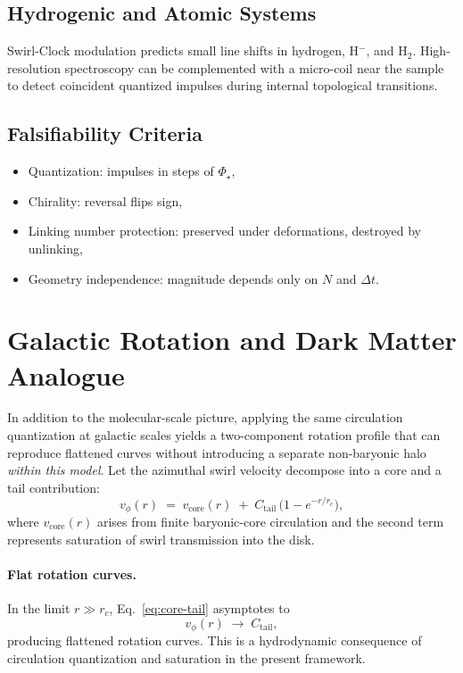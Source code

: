 \documentclass[reprint,aps,onecolumn,nofootinbib]{revtex4-2}
\newcommand{\rc}{r_c}                                    %
\providecommand{\rc}{r_c}
\begin{document}
    \subsection{Hydrogenic and Atomic Systems}
    Swirl-Clock modulation predicts small line shifts in hydrogen, H$^-$, and H$_2$. High-resolution spectroscopy
    can be complemented with a micro-coil near the sample to detect coincident quantized impulses during
    internal topological transitions.

    \subsection{Falsifiability Criteria}
    \begin{itemize}
        \item Quantization: impulses in steps of $\Phi_\star$,
        \item Chirality: reversal flips sign,
        \item Linking number protection: preserved under deformations, destroyed by unlinking,
        \item Geometry independence: magnitude depends only on $N$ and $\Delta t$.
    \end{itemize}

\section{Galactic Rotation and Dark Matter Analogue}
\label{sec:galactic-dm}

    In addition to the molecular-scale picture, applying the same circulation quantization at galactic scales yields a two-component rotation profile that can reproduce flattened curves without introducing a separate non-baryonic halo \emph{within this model}.
    Let the azimuthal swirl velocity decompose into a core and a tail contribution:
    \begin{equation}
        v_\phi(r) \;=\; v_\text{core}(r) \;+\;
        C_\text{tail}\,\Big(1-e^{-r/\rc}\Big),
        \label{eq:core-tail}
    \end{equation}
    where $v_\text{core}(r)$ arises from finite baryonic-core circulation and the
    second term represents saturation of swirl transmission into the disk.

    \paragraph{Flat rotation curves.}
    In the limit $r\gg \rc$, Eq.~\eqref{eq:core-tail} asymptotes to
    \[
        v_\phi(r) \;\longrightarrow\; C_\text{tail},
    \]
    producing flattened rotation curves. This is a hydrodynamic consequence of circulation quantization and saturation in the present framework.
\end{document}
